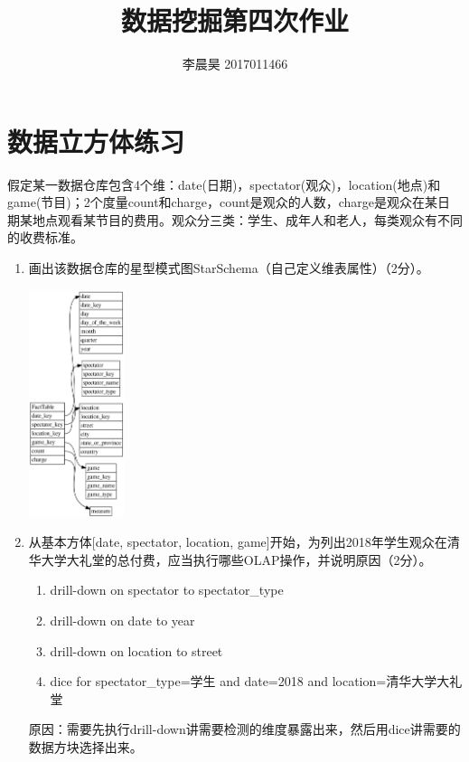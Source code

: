 \documentclass[12pt, UTF8]{article}
\title{数据挖掘第四次作业}
\author{李晨昊 2017011466}
\begin{document}
\maketitle

\section{数据立方体练习}

假定某一数据仓库包含4个维：date(日期)，spectator(观众)，location(地点)和game(节目)；2个度量count和charge，count是观众的人数，charge是观众在某日期某地点观看某节目的费用。观众分三类：学生、成年人和老人，每类观众有不同的收费标准。
\begin{enumerate}
  \item 画出该数据仓库的星型模式图StarSchema（自己定义维表属性）（2分）。

  \begin{center}
    \includegraphics[width=0.22\textwidth]{t1.png}
  \end{center}
  
  \item 从基本方体[date, spectator, location, game]开始，为列出2018年学生观众在清华大学大礼堂的总付费，应当执行哪些OLAP操作，并说明原因（2分）。
  
  \begin{enumerate}
    \item drill-down on spectator to spectator\_type
    \item drill-down on date to year
    \item drill-down on location to street
    \item dice for spectator\_type=学生 and date=2018 and location=清华大学大礼堂
  \end{enumerate}

  原因：需要先执行drill-down讲需要检测的维度暴露出来，然后用dice讲需要的数据方块选择出来。
\end{enumerate}
\end{document}
